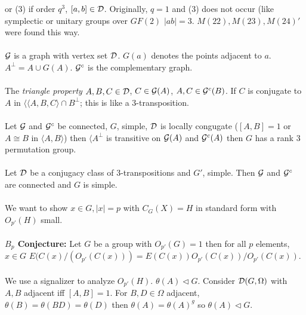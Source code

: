 or (3) if order $q^3$, $[a, b] \in {\cal D}$.  Originally, $q=1$ and (3) does not occur (like symplectic or unitary
groups over $GF(2)$ $|ab|=3$.  $M(22), M(23), M(24)'$ were found this way.
\\
\\
${\cal G}$ is a graph with vertex set ${\cal D}$.  $G(a)$ denotes the points adjacent to $a$.  $A^{\perp} = A \cup G(A)$.
${\cal G}^c$ is the complementary graph.
\\
\\
The \emph{triangle property} $A, B, C \in {\cal D}$, $C \in {\cal G}(A)$, $A, C \in {\cal G}^c(B)$. If $C$ is conjugate
to $A$ in $\langle \langle A, B, C \rangle \cap B^{\perp}$; this is like a $3$-transposition.
\\
\\
Let ${\cal G}$ and ${\cal G}^c$ be connected, $G$, simple, ${\cal D}$ is locally congugate ($[A, B] =1$ or $A \cong B$ in
$\langle A, B \rangle$) then $\langle A^{\perp}$ is transitive on ${\cal G}(A)$ and ${\cal G}^c(A)$ then $G$ has a rank $3$
permutation group.
\\
\\
Let ${\cal D}$ be a conjugacy class of $3$-transpositions and $G'$, simple.  Then ${\cal G}$ and ${\cal G}^c$ are connected
and $G$ is simple.
\\
\\
We want to show $x \in G, |x|=p$ with $C_G(X) = H$ in standard form with $O_{p'}(H)$ small.
\\
\\
{\bf $B_p$ Conjecture:} Let $G$ be a group with $O_{p'}(G)=1$ then for all $p$ elements, $x \in G$
$E(C(x)/(O_{p'}(C(x))) = E(C(x)) O_{p'}(C(x))/O_{p'}(C(x))$.
\\
\\
We use a signalizer to analyze $O_{p'}(H)$.  $\theta(A) \lhd G$.  Consider
${\cal D}(G, \Omega)$ with $A, B$ adjacent
iff $[A, B] = 1$.  For $B, D \in \Omega$ adjacent,
$\theta(B)=\theta(BD)=\theta(D)$ then $\theta(A) = \theta(A)^g$ so
$\theta(A) \lhd G$.

